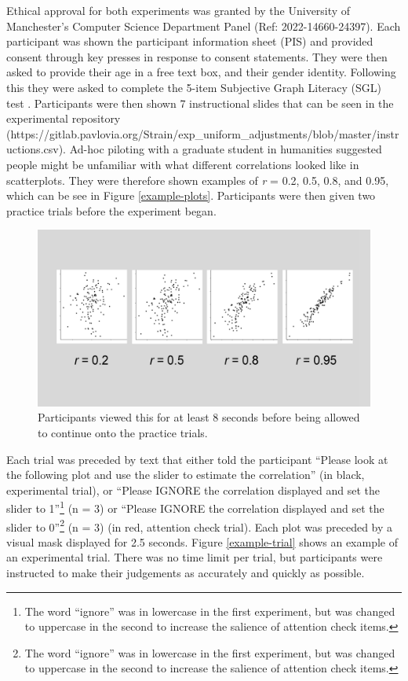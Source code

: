 \documentclass[preprint, 3p,
authoryear]{elsarticle} %
\begin{document}
Ethical approval for both experiments was granted by the University of
Manchester's Computer Science Department Panel (Ref: 2022-14660-24397).
Each participant was shown the participant information sheet (PIS) and
provided consent through key presses in response to consent statements.
They were then asked to provide their age in a free text box, and their
gender identity. Following this they were asked to complete the 5-item
Subjective Graph Literacy (SGL) test \citep{garcia_2016}. Participants
were then shown 7 instructional slides that can be seen in the
experimental repository
(https://gitlab.pavlovia.org/Strain/exp\_uniform\_adjustments/blob/master/instructions.csv).
Ad-hoc piloting with a graduate student in humanities suggested people
might be unfamiliar with what different correlations looked like in
scatterplots. They were therefore shown examples of \emph{r} = 0.2, 0.5,
0.8, and 0.95, which can be see in Figure \ref{example-plots}.
Participants were then given two practice trials before the experiment
began.

\begin{figure}

\includegraphics[width=0.5\linewidth]{images/example-plots} \hfill{}

\caption{\label{example-plots}Participants viewed this for at least 8 seconds before being allowed to continue onto the practice trials.}\label{fig:example-plots}
\end{figure}

Each trial was preceded by text that either told the participant
``Please look at the following plot and use the slider to estimate the
correlation'' (in black, experimental trial), or ``Please IGNORE the
correlation displayed and set the slider to 1''\footnote{The word
  ``ignore'' was in lowercase in the first experiment, but was changed
  to uppercase in the second to increase the salience of attention check
  items.} (n = 3) or ``Please IGNORE the correlation displayed and set
the slider to 0''\footnote{The word ``ignore'' was in lowercase in the
  first experiment, but was changed to uppercase in the second to
  increase the salience of attention check items.} (n = 3) (in red,
attention check trial). Each plot was preceded by a visual mask
displayed for 2.5 seconds. Figure \ref{example-trial} shows an example
of an experimental trial. There was no time limit per trial, but
participants were instructed to make their judgements as accurately and
quickly as possible.
\end{document}
